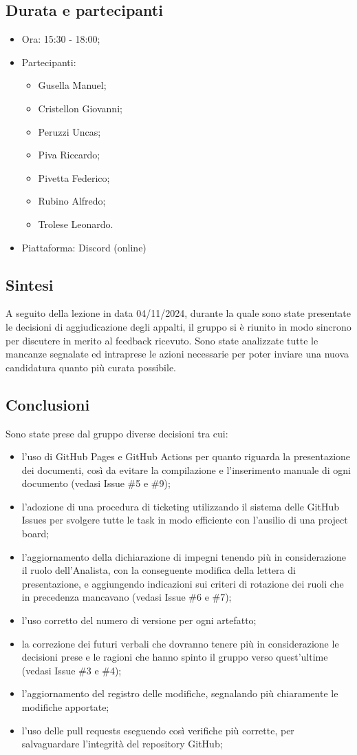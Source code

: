 \documentclass[12pt]{article}
\begin{document}
\subsection{Durata e partecipanti}
\begin{itemize}
\item Ora: 15:30 - 18:00;
\item Partecipanti: 	
	\begin{itemize}
	\item Gusella Manuel;
	\item Cristellon Giovanni;
	\item Peruzzi Uncas;
	\item Piva Riccardo;
	\item Pivetta Federico;
	\item Rubino Alfredo;
	\item Trolese Leonardo.
	\end{itemize}
\item Piattaforma: Discord (online)
\end{itemize}
\subsection{Sintesi}
A seguito della lezione in data 04/11/2024, durante la quale sono state presentate le decisioni di aggiudicazione degli appalti, il gruppo si è riunito in modo sincrono per discutere in merito al feedback ricevuto. Sono state analizzate tutte le mancanze segnalate ed intraprese le azioni necessarie per poter inviare una nuova candidatura quanto più curata possibile.
\subsection{Conclusioni}
Sono state prese dal gruppo diverse decisioni tra cui:
\begin{itemize}
\item l'uso di GitHub Pages e GitHub Actions per quanto riguarda la presentazione dei documenti, così da evitare la compilazione e l'inserimento manuale di ogni documento (vedasi Issue \#5 e \#9);
\item l'adozione di una procedura di ticketing utilizzando il sistema delle GitHub Issues per svolgere tutte le task in modo efficiente con l'ausilio di una project board;
\item l'aggiornamento della dichiarazione di impegni tenendo più in considerazione il ruolo dell'Analista, con la conseguente modifica della lettera di presentazione, e aggiungendo indicazioni sui criteri di rotazione dei ruoli che in precedenza mancavano (vedasi Issue \#6 e \#7);
\item l'uso corretto del numero di versione per ogni artefatto;
\item la correzione dei futuri verbali che dovranno tenere più in considerazione le decisioni prese e le ragioni che hanno spinto il gruppo verso quest'ultime (vedasi Issue \#3 e \#4); 
\item l'aggiornamento del registro delle modifiche, segnalando più chiaramente le modifiche apportate;
\item l'uso delle pull requests eseguendo così verifiche più corrette, per salvaguardare l'integrità del repository GitHub;
\end{itemize}
\end{document}
